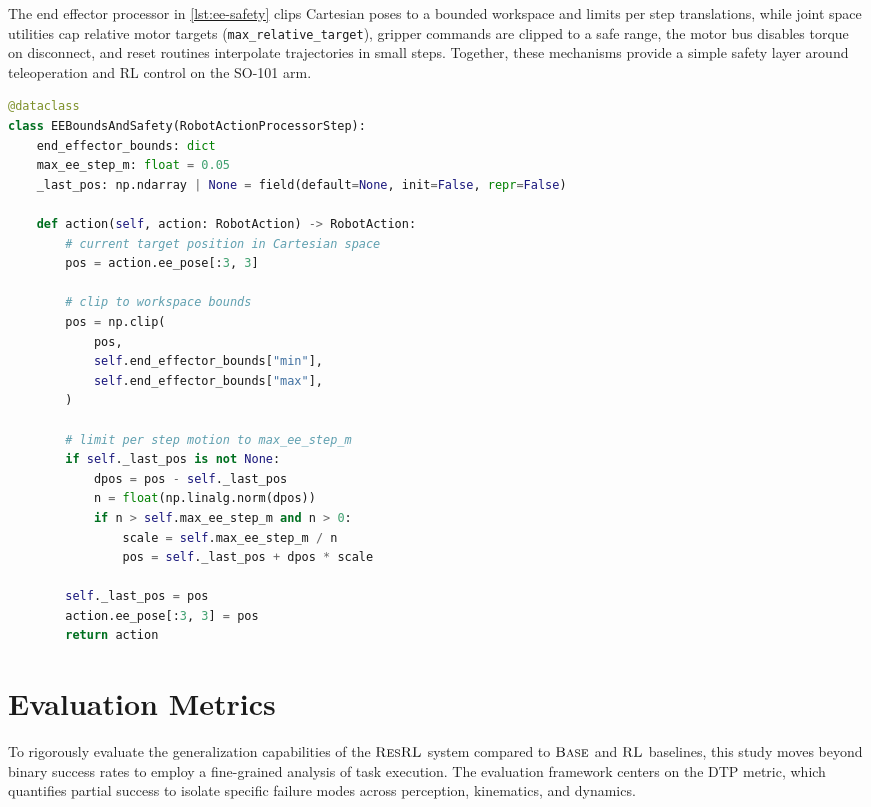 The end effector processor in \cref{lst:ee-safety} clips Cartesian poses to a bounded workspace and limits per step translations, while joint space utilities cap relative motor targets (\texttt{max\_relative\_target}), gripper commands are clipped to a safe range, the motor bus disables torque on disconnect, and reset routines interpolate trajectories in small steps. Together, these mechanisms provide a simple safety layer around teleoperation and RL control on the SO-101 arm.

\begin{lstlisting}[float=ht,language=Python,frame=tb,
caption={End effector safety processor in the LeRobot stack. The step clips the commanded pose to a bounded workspace and limits the maximum translation between consecutive commands.},
label=lst:ee-safety]
@dataclass
class EEBoundsAndSafety(RobotActionProcessorStep):
    end_effector_bounds: dict
    max_ee_step_m: float = 0.05
    _last_pos: np.ndarray | None = field(default=None, init=False, repr=False)

    def action(self, action: RobotAction) -> RobotAction:
        # current target position in Cartesian space
        pos = action.ee_pose[:3, 3]

        # clip to workspace bounds
        pos = np.clip(
            pos,
            self.end_effector_bounds["min"],
            self.end_effector_bounds["max"],
        )

        # limit per step motion to max_ee_step_m
        if self._last_pos is not None:
            dpos = pos - self._last_pos
            n = float(np.linalg.norm(dpos))
            if n > self.max_ee_step_m and n > 0:
                scale = self.max_ee_step_m / n
                pos = self._last_pos + dpos * scale

        self._last_pos = pos
        action.ee_pose[:3, 3] = pos
        return action
\end{lstlisting}

\section{Evaluation Metrics}
\label{sec:method:evaluation_metrics}

To rigorously evaluate the generalization capabilities of the $\text{\textsc{ResRL}}$ system compared to $\text{\textsc{Base}}$ and $\text{\textsc{RL}}$ baselines, this study moves beyond binary success rates to employ a fine-grained analysis of task execution. The evaluation framework centers on the \ac{DTP} metric, which quantifies partial success to isolate specific failure modes across perception, kinematics, and dynamics.

